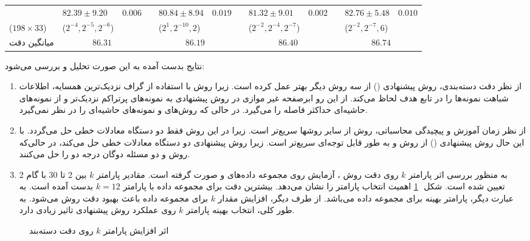 \begin{table*}[!t]
{\begin{tabular}{p{1.95cm} p{1.95cm} p{1.1cm} c p{1.95cm} p{1.1cm} c p{1.95cm} p{1.1cm} c p{1.95cm} p{1.1cm}}
		\lr{Wpbc} & $82.39\pm9.20$ & $0.006$ && $80.84\pm8.94$ & $0.019$ && $81.32\pm9.01$ & $0.002$ &&  \textbf{$82.76\pm5.48$} & $0.010$ \\
		($198\times 33$) & ($2^{-4}, 2^{-5}, 2^{-6}$) &  && ($2^{1}, 2^{-10}, 2$) &  && ($2^{-2}, 2^{-4}, 2^{-7}$) &  && ($2^{-2}, 2^{-7}, 6$) &  \\
		\midrule
		میانگین دقت  & \multicolumn{2}{c}{$86.31$} && \multicolumn{2}{c}{$86.19$} && \multicolumn{2}{c}{$86.40$} && \multicolumn{2}{c}{\textbf{$86.74$}} \\
		\bottomrule
	\end{tabular}}
	
	\label{tab:3}
\end{table*}

نتایج بدست آمده به این صورت تحلیل و بررسی می‌شود:
\begin{enumerate}
	\item از نظر دقت دسته‌بندی، روش پیشنهادی () از سه روش دیگر بهتر عمل کرده است. زیرا روش  با استفاده از گراف نزدیک‌ترین همسایه، اطلاعات شباهت نمونه‌ها را در تابع هدف لحاظ می‌کند. از این رو ابرصفحه غیر موازی در روش پیشنهادی به نمونه‌های پرتراکم نزدیک‌تر و از نمونه‌های حاشیه‌ای حداکثر فاصله را می‌گیرد. در حالی که روش‌های  و   نمونه‌های حاشیه‌ای را در نظر نمی‌گیرد.
	\item از نظر زمان آموزش و پیچیدگی محاسباتی، روش  از سایر روشها سریع‌تر است. زیرا در این روش فقط دو دستگاه معادلات خطی حل می‌گردد. با این حال روش پیشنهادی () از روش  و  به طور قابل توجه‌ای سریع‌تر است. زیرا روش پیشنهادی دو دستگاه معادلات خطی حل می‌کند، در حالی‌که روش  و  دو مسئله دوگان درجه دو را حل می‌کنند.
	\item به منظور بررسی اثر پارامتر  $k$ روی دقت روش ، آزمایش روی مجموعه داده‌های  و  صورت گرفته است. مقادیر پارامتر  $k$ بین 2 تا 30 با گام 2 تعیین شده است. شکل ‏ \ref{fig:KNN-LSTSVM-Aust-Hepa} اهمیت انتخاب پارامتر   را نشان می‌دهد. بیشترین دقت برای مجموعه داده  با پارامتر  $k=12$ بدست آمده است. به عبارت دیگر،  پارامتر بهینه برای مجموعه داده  می‌باشد. از طرف دیگر، افزایش مقدار  $k$ برای مجموعه داده  باعث بهبود دقت روش  می‌شود. به طور کلی، انتخاب بهینه پارامتر  $k$ روی عملکرد روش پیشنهادی تاثیر زیادی دارد.
\end{enumerate}

\begin{figure}[!t]
	\centering
	\caption{اثر افزایش پارامتر $k$ روی دقت دسته‌بند }
	\label{fig:KNN-LSTSVM-Aust-Hepa}
\end{figure}

